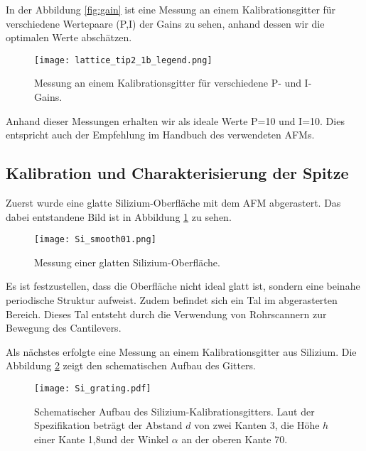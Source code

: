 In der Abbildung \ref{fig:gain} ist eine Messung an einem Kalibrationsgitter für verschiedene Wertepaare (P,I) der Gains zu sehen, anhand dessen wir die optimalen Werte abschätzen.
\begin{figure}[h]
	\centering
	\texttt{[image: lattice\_tip2\_1b\_legend.png]}
	\caption{Messung an einem Kalibrationsgitter für verschiedene P- und I-Gains.}
\end{figure}
Anhand dieser Messungen erhalten wir als ideale Werte P=10 und I=10. Dies entspricht auch der Empfehlung im Handbuch des verwendeten AFMs.
\subsection{Kalibration und Charakterisierung der Spitze}
Zuerst wurde eine glatte Silizium-Oberfläche mit dem AFM abgerastert. Das dabei entstandene Bild ist in Abbildung \ref{fig:Si_smooth01} zu sehen.
\begin{figure}[h]
	\centering
	\texttt{[image: Si\_smooth01.png]}
	\caption{Messung einer glatten Silizium-Oberfläche.}
	\label{fig:Si_smooth01}
\end{figure}
Es ist festzustellen, dass die Oberfläche nicht ideal glatt ist, sondern eine beinahe periodische Struktur aufweist. Zudem befindet sich ein Tal im abgerasterten Bereich. Dieses Tal entsteht durch die Verwendung von Rohrscannern zur Bewegung des Cantilevers.

Als nächstes erfolgte eine Messung an einem Kalibrationsgitter aus Silizium. Die Abbildung \ref{fig:Si_grating} zeigt den schematischen Aufbau des Gitters.
\begin{figure}[h]
	\centering
	\texttt{[image: Si\_grating.pdf]}
	\caption{Schematischer Aufbau des Silizium-Kalibrationsgitters. Laut der Spezifikation beträgt der Abstand $d$ von zwei Kanten 3\micro\metre, die Höhe $h$ einer Kante 1,8\micro\metre und der Winkel $\alpha$ an der oberen Kante 70\degree.}
	\label{fig:Si_grating}
\end{figure}

